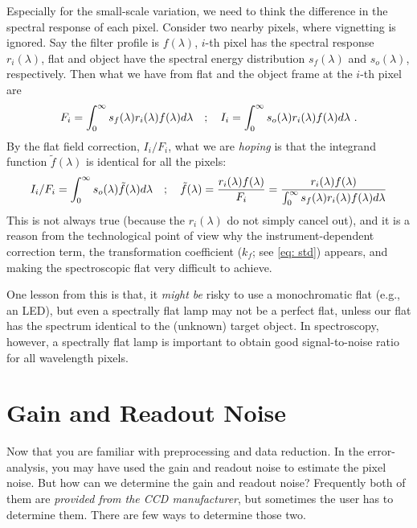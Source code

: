 Especially for the small-scale variation, we need to think the difference in the spectral response of each pixel. Consider two nearby pixels, where vignetting is ignored. Say the filter profile is $ f(\lambda) $, $ i $-th pixel has the spectral response $ r_i(\lambda)$, flat and object have the spectral energy distribution $ s_f(\lambda) $ and $ s_o(\lambda) $, respectively. Then what we have from flat and the object frame at the $ i $-th pixel are
\begin{equation}
  F_i = \int_{0}^{\infty} s_f(\lambda) r_i(\lambda) f(\lambda) d\lambda
  \quad;\quad
  I_i = \int_{0}^{\infty} s_o(\lambda) r_i(\lambda) f(\lambda) d\lambda ~.
\end{equation}
By the flat field correction, $ I_i/F_i $, what we are \emph{hoping} is that the integrand function $ \tilde{f}(\lambda) $ is identical for all the pixels:
\begin{equation}
  I_i/F_i = \int_{0}^{\infty} s_o(\lambda) \tilde{f}(\lambda) d\lambda
  \quad;\quad
  \tilde{f}(\lambda) 
    = \frac{r_i(\lambda) f(\lambda)}{F_i} 
    = \frac{r_i(\lambda) f(\lambda)}
      {\int_{0}^{\infty} s_f(\lambda) r_i(\lambda) f(\lambda) d\lambda}
\end{equation}
This is not always true (because the $ r_i(\lambda) $ do not simply cancel out), and it is a reason from the technological point of view why the instrument-dependent correction term, the transformation coefficient ($ k_f $; see \cref{eq: std}) appears, and making the spectroscopic flat very difficult to achieve.

One lesson from this is that, it \emph{might be} risky to use a monochromatic flat (e.g., an LED), but even a spectrally flat lamp may not be a perfect flat, unless our flat has the spectrum identical to the (unknown) target object. In spectroscopy, however, a spectrally flat lamp is important to obtain good signal-to-noise ratio for all wavelength pixels.

\section{Gain and Readout Noise}
Now that you are familiar with preprocessing and data reduction. In the error-analysis, you may have used the gain and readout noise to estimate the pixel noise. But how can we determine the gain and readout noise? Frequently both of them are \textit{provided from the CCD manufacturer}, but sometimes the user has to determine them. There are few ways to determine those two.

